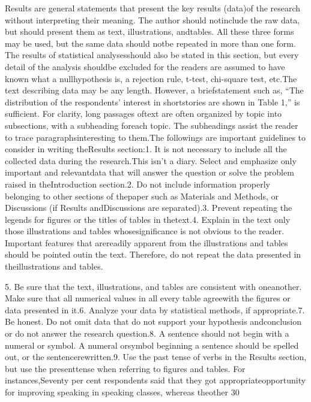 Results are general statements that present the key results (data)of the research without interpreting their meaning. The author should notinclude the raw data, but should present them as text, illustrations, andtables. All these three forms may be used, but the same data should notbe repeated in more than one form. The results of statistical analysesshould also be stated in this section, but every detail of the analysis shouldbe excluded for the readers are assumed to have known what a nullhypothesis is, a rejection rule, t-test, chi-square test, etc.The text describing data may be any length. However, a briefstatement such as, “The distribution of the respondents’ interest in shortstories are shown in Table 1,” is sufficient. For clarity, long passages oftext are often organized by topic into subsections, with a subheading foreach topic. The subheadings assist the reader to trace paragraphsinteresting to them.The followings are important guidelines to consider in writing theResults section:1.  It is not necessary to include all the collected data during the research.This isn't a diary. Select and emphasize only important and relevantdata that will answer the question or solve the problem raised in theIntroduction section.2.  Do not include information properly belonging to other sections of thepaper such as Materials and Methods, or Discussions (if Results andDiscussions are separated).3.  Prevent repeating the legends for figures or the titles of tables in thetext.4. Explain in the text only those illustrations and tables whosesignificance is not obvious to the reader. Important features that arereadily apparent from the illustrations and tables should be pointed outin the text. Therefore, do not repeat the data presented in theillustrations and tables.


5.  Be sure that the text, illustrations, and tables are consistent with oneanother. Make sure that all numerical values in all every table agreewith the figures or data presented in it.6.  Analyze your data by statistical methods, if appropriate.7.  Be honest. Do not omit data that do not support your hypothesis andconclusion or do not answer the research question.8.  A sentence should not begin with a numeral or symbol. A numeral orsymbol beginning a sentence should be spelled out, or the sentencerewritten.9.  Use the past tense of verbs in the Results section, but use the presenttense when referring to figures and tables. For instances,Seventy per cent respondents said that they got appropriateopportunity for improving speaking in speaking classes, whereas theother 30%


